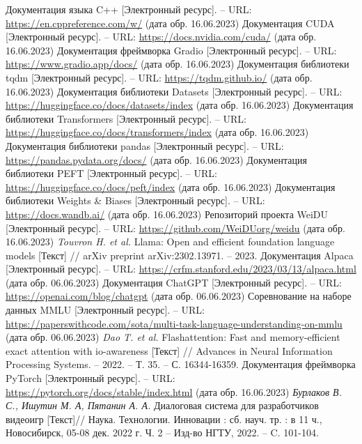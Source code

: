 \begin{thebibliography}{99}
  Документация языка C++ [Электронный ресурс]. -- URL: \url{https://en.cppreference.com/w/} (дата обр. 16.06.2023)
  Документация CUDA [Электронный ресурс]. -- URL: \url{https://docs.nvidia.com/cuda/} (дата обр. 16.06.2023)
  Документация фреймворка Gradio [Электронный ресурс]. -- URL: \url{https://www.gradio.app/docs/} (дата обр. 16.06.2023)
  Документация библиотеки tqdm [Электронный ресурс]. -- URL: \url{https://tqdm.github.io/} (дата обр. 16.06.2023)
  Документация библиотеки Datasets [Электронный ресурс]. -- URL: \url{https://huggingface.co/docs/datasets/index} (дата обр. 16.06.2023)
  Документация библиотеки Transformers [Электронный ресурс]. -- URL: \url{https://huggingface.co/docs/transformers/index} (дата обр. 16.06.2023)
  Документация библиотеки pandas [Электронный ресурс]. -- URL: \url{https://pandas.pydata.org/docs/} (дата обр. 16.06.2023)
  Документация библиотеки PEFT [Электронный ресурс]. -- URL: \url{https://huggingface.co/docs/peft/index} (дата обр. 16.06.2023)
  Документация библиотеки Weights \& Biases [Электронный ресурс]. -- URL: \url{https://docs.wandb.ai/} (дата обр. 16.06.2023)
  Репозиторий проекта WeiDU [Электронный ресурс]. -- URL: \url{https://github.com/WeiDUorg/weidu} (дата обр. 16.06.2023)
  \textit{Touvron H. et al.} Llama: Open and efficient foundation language models [Текст] // arXiv preprint arXiv:2302.13971. – 2023.
  Документация Alpaca [Электронный ресурс]. -- URL: \url{https://crfm.stanford.edu/2023/03/13/alpaca.html} (дата обр. 06.06.2023)
  Документация ChatGPT [Электронный ресурс]. -- URL: \url{https://openai.com/blog/chatgpt} (дата обр. 06.06.2023)
  Соревнование на наборе данных MMLU [Электронный ресурс]. -- URL: \url{https://paperswithcode.com/sota/multi-task-language-understanding-on-mmlu} (дата обр. 06.06.2023)
  \textit{Dao T. et al.} Flashattention: Fast and memory-efficient exact attention with io-awareness [Текст] // Advances in Neural Information Processing Systems. – 2022. – Т. 35. – С. 16344-16359.
  Документация фреймворка PyTorch [Электронный ресурс]. -- URL: \url{https://pytorch.org/docs/stable/index.html} (дата обр. 16.06.2023)
  \textit{Бурлаков В. С., Ишутин М. А, Пятанин А. А.} Диалоговая система для разработчиков видеоигр [Текст]// Наука. Технологии. Инновации : сб. науч. тр. : в 11 ч., Новосибирск, 05-08 дек. 2022 г. Ч. 2 -- Изд-во НГТУ, 2022. -- C. 101-104.
\end{thebibliography}